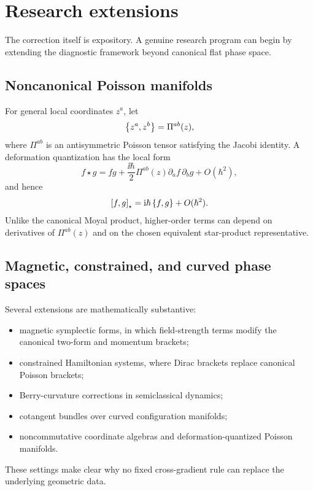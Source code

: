 \section{Research extensions}

The correction itself is expository. A genuine research program can begin by extending the diagnostic framework beyond canonical flat phase space.

\subsection{Noncanonical Poisson manifolds}

For general local coordinates \(z^a\), let
\begin{equation}
\left\{z^a,z^b\right\}=\Pi^{ab}(z),
\end{equation}
where \(\Pi^{ab}\) is an antisymmetric Poisson tensor satisfying the Jacobi identity. A deformation quantization has the local form
\begin{equation}
f\star g
=fg+\frac{\ii\hbar}{2}\Pi^{ab}(z)
\partial_a f\,\partial_b g+O(\hbar^2),
\end{equation}
and hence
\begin{equation}
\left[f,g\right]_{\star}
=
\mathrm{i}\hbar\left\{f,g\right\}+O(\hbar^2).
\label{eq:generalstar}
\end{equation}
Unlike the canonical Moyal product, higher-order terms can depend on derivatives of \(\Pi^{ab}(z)\) and on the chosen equivalent star-product representative.

\subsection{Magnetic, constrained, and curved phase spaces}

Several extensions are mathematically substantive:
\begin{itemize}
  \item magnetic symplectic forms, in which field-strength terms modify the canonical two-form and momentum brackets;
  \item constrained Hamiltonian systems, where Dirac brackets replace canonical Poisson brackets;
  \item Berry-curvature corrections in semiclassical dynamics;
  \item cotangent bundles over curved configuration manifolds;
  \item noncommutative coordinate algebras and deformation-quantized Poisson manifolds.
\end{itemize}
These settings make clear why no fixed cross-gradient rule can replace the underlying geometric data.

